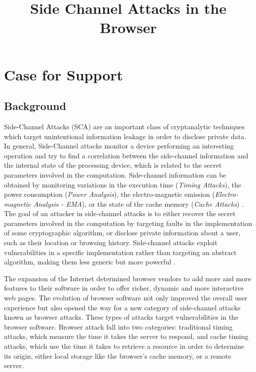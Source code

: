 \documentclass[a4paper,11pt]{article}
\title{Side Channel Attacks in the Browser}
\date{}
\begin{document}
\maketitle

\section*{Case for Support}


\subsection*{Background}
Side-Channel Attacks (SCA) are an important class of cryptanalytic techniques which target unintentional information leakage in order to disclose private data. In general, Side-Channel attacks monitor a device performing an interesting operation and try to find a correlation between the side-channel information and the internal state of the processing device, which is related to the secret parameters involved in the computation. Side-channel information can be obtained by monitoring variations in the execution time (\textit{Timing Attacks}), the power consumption (\textit{Power Analysis}), the electro-magnetic emission (\textit{Electro-magnetic Analysis - EMA}), or the state of the cache memory (\textit{Cache Attacks}) \cite{standaert2010introduction}. The goal of an attacker in side-channel attacks is to either recover the secret parameters involved in the computation by targeting faults in the implementation of some cryptographic algorithm, or disclose private information about a user, such as their location or browsing history. Side-channel attacks exploit vulnerabilities in a specific implementation rather than targeting an abstract algorithm, making them less generic but more powerful \cite{standaert2010introduction}.

The expansion of the Internet determined browser vendors to add more and more features to their software in order to offer richer, dynamic and more interactive web pages. The evolution of browser software not only improved the overall user experience but also opened the way for a new category of side-channel attacks known as browser attacks. These types of attacks target vulnerabilities in the browser software. Browser attack fall into two categories: traditional timing attacks, which measure the time it takes the server to respond, and cache timing attacks, which use the time it takes to retrieve a resource in order to determine its origin, either local storage like the browser's cache memory, or a remote server.
\end{document}
